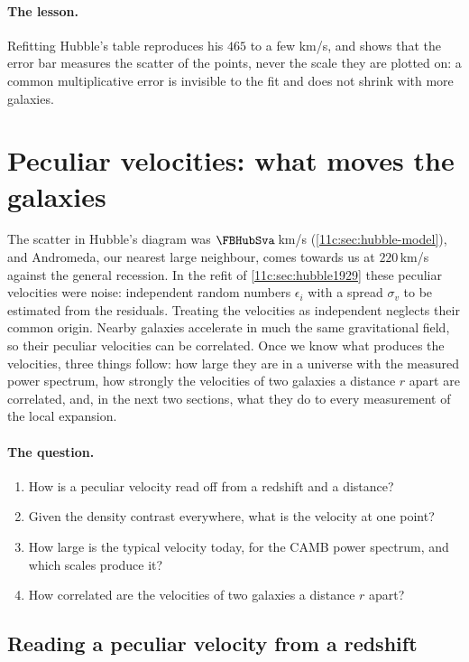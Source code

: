 \paragraph{The lesson.} Refitting Hubble's table reproduces his $465$ to a few
km/s, and shows that the error bar measures the scatter of the points, never the
scale they are plotted on: a common multiplicative error is invisible to the fit
and does not shrink with more galaxies.
\section{Peculiar velocities: what moves the galaxies}
\label{11c:sec:pecvel}

The scatter in Hubble's diagram was $\FBHubSva$\,km/s
(\cref{11c:sec:hubble-model}), and Andromeda, our nearest large neighbour, comes
towards us at $220$\,km/s against the general recession. In the refit of
\cref{11c:sec:hubble1929} these peculiar velocities were noise: independent random
numbers $\epsilon_i$ with a spread $\sigma_v$ to be estimated from the residuals.
Treating the velocities as independent neglects their common origin.
Nearby galaxies accelerate in much the same gravitational field, so their
peculiar velocities can be correlated. Once we know
what produces the velocities, three things follow: how large they are in a
universe with the measured power spectrum, how strongly the velocities of two
galaxies a distance $r$ apart are correlated, and, in the next two sections, what
they do to every measurement of the local expansion.

\paragraph{The question.}
\begin{enumerate}
  \item How is a peculiar velocity read off from a redshift and a distance?
  \item Given the density contrast everywhere, what is the velocity at one point?
  \item How large is the typical velocity today, for the CAMB power spectrum, and
        which scales produce it?
  \item How correlated are the velocities of two galaxies a distance $r$ apart?
\end{enumerate}

\subsection{Reading a peculiar velocity from a redshift}
\label{11c:sec:pv-redshift}

